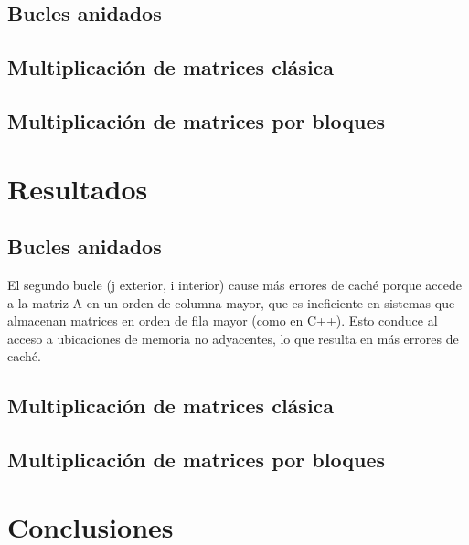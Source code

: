 \documentclass[conference]{IEEEtran}
\begin{document}
\subsection{Bucles anidados}
\subsection{Multiplicación de matrices clásica}
\subsection{Multiplicación de matrices por bloques}

\section{Resultados}\label{sec:res}
\subsection{Bucles anidados}
El segundo bucle (j exterior, i interior) cause más errores de caché porque accede a la matriz A en un orden de columna mayor, que es ineficiente en sistemas que almacenan matrices en orden de fila mayor (como en C++). Esto conduce al acceso a ubicaciones de memoria no adyacentes, lo que resulta en más errores de caché.
\subsection{Multiplicación de matrices clásica}
\subsection{Multiplicación de matrices por bloques}
\section{Conclusiones}\label{sec:conc}



\vspace{12pt}
\end{document}
